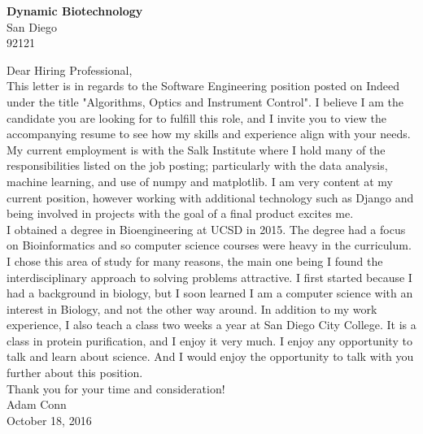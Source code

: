 \documentclass{my_cv}
\begin{document}

\noindent
\Large \textbf{Dynamic Biotechnology} \\
San Diego\\
92121

\vspace{0.25in}
\noindent Dear Hiring Professional,\\

\noindent
This letter is in regards to the Software Engineering position posted on Indeed under the title "Algorithms, Optics and Instrument Control".
I believe I am the candidate you are looking for to fulfill this role, and I invite you to view the accompanying resume to see how my skills and experience
align with your needs.  My current employment is with the Salk Institute where I hold many of the responsibilities listed on the job posting; particularly
with the data analysis, machine learning, and use of numpy and matplotlib. I am very content at my current position, however working with additional technology
such as Django and being involved in projects with the goal of a final product excites me.\\

\noindent
I obtained a degree in Bioengineering at UCSD in 2015. The degree had a focus on Bioinformatics and so computer science courses were
heavy in the curriculum.
I chose this area of study for many reasons, the main one being I found the interdisciplinary approach to solving problems attractive.
I first started because I had a background in biology, but I soon learned I am a computer science with an interest in Biology, and not the other
way around.  In addition to my work experience, I also teach a class two weeks a year at San Diego City College. It is a class in protein purification,
and I enjoy it very much.  I enjoy any opportunity to talk and learn about science. And I would enjoy the opportunity to talk with you further about this position.\\

\noindent
Thank you for your time and consideration!\\

\noindent
Adam Conn\\
October 18, 2016
\end{document}
